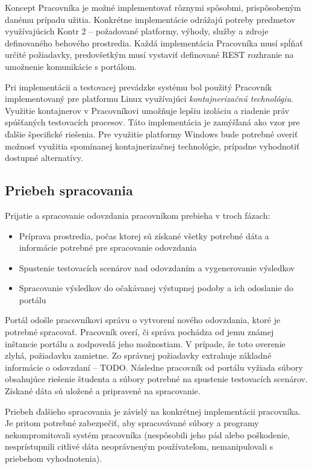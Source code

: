 \documentclass[
  digital, %
  twoside, %
  table,   %
  lof,     %
  lot,     %
]{fithesis3}
\begin{document}
Koncept Pracovníka je možné implementovať rôznymi spôsobmi, prispôsobeným danému prípadu užitia. Konkrétne implementácie odrážajú potreby predmetov využívajúcich Kontr 2 -- požadované platformy, výhody, služby a zdroje definovaného behového prostredia. Každá implementácia Pracovníka musí spĺňať určité požiadavky, predovšetkým musí vystaviť definované REST rozhranie na umožnenie komunikácie s portálom. 

Pri implementácii a testovacej prevádzke systému bol použitý Pracovník implementovaný pre platformu Linux využívajúci \emph{kontajnerizačnú technológiu}. Využitie kontajnerov v Pracovníkovi umožňuje lepšiu izoláciu a riadenie práv spúšťaných testovacích procesov. Táto implementácia je zamýšľaná ako vzor pre ďalšie špecifické riešenia. Pre využitie platformy Windows bude potrebné overiť možnosť využitia spomínanej kontajnerizačnej technológie, prípadne vyhodnotiť dostupné alternatívy.

\subsection{Priebeh spracovania}

Prijatie a spracovanie odovzdania pracovníkom prebieha v troch fázach:

\begin{itemize}
    \item Príprava prostredia, počas ktorej sú získané všetky potrebné dáta a informácie potrebné pre spracovanie odovzdania
    \item Spustenie testovacích scenárov nad odovzdaním a vygenerovanie výsledkov
    \item Spracovanie výsledkov do očakávanej výstupnej podoby a ich odoslanie do portálu
\end{itemize}

Portál odošle pracovníkovi správu o vytvorení nového odovzdania, ktoré je potrebné spracovať. Pracovník overí, či správa pochádza od jemu známej inštancie portálu a zodpovedá jeho možnostiam.  V prípade, že toto overenie zlyhá, požiadavku zamietne. Zo správnej požiadavky extrahuje základné informácie o odovzdaní -- TODO. Následne pracovník od portálu vyžiada súbory obsahujúce riešenie študenta a súbory potrebné na spustenie testovacích scenárov. Získané dáta sú uložené a pripravené na spracovanie. 

Priebeh ďalšieho spracovania je závislý na konkrétnej implementácii pracovníka. Je pritom potrebné zabezpečiť, aby spracovávané súbory a programy nekompromitovali systém pracovníka (nespôsobili jeho pád alebo poškodenie, nesprístupnili citlivé dáta neoprávneným používateľom, nemanipulovali s priebehom vyhodnotenia). 
\end{document}
